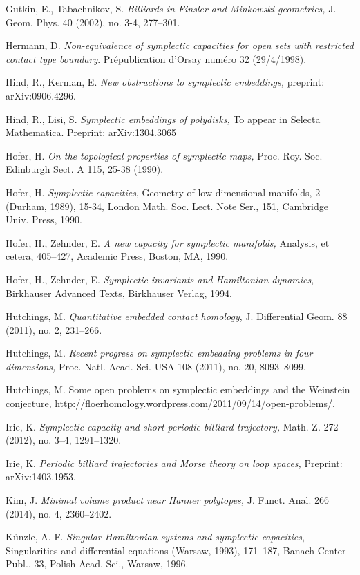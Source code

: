 \documentclass{icmart}
\theoremstyle{definition}
\begin{document}
\begin{thebibliography}{7}
 Gutkin, E., Tabachnikov, S. {\it Billiards in Finsler and Minkowski geometries,} J. Geom. Phys. 40 (2002), no. 3-4, 277--301.

 Hermann, D. {\it Non-equivalence of symplectic capacities for open
sets with restricted contact type boundary}. Pr\'epublication
d'Orsay num\'ero 32 (29/4/1998).

 Hind, R., Kerman, E. {\it New obstructions to symplectic embeddings,} preprint:  arXiv:0906.4296.

  Hind, R., Lisi, S. {\it Symplectic embeddings of polydisks,} To appear in Selecta Mathematica.  Preprint: arXiv:1304.3065

 Hofer, H. {\it On the topological properties of symplectic
maps,} Proc. Roy. Soc. Edinburgh Sect. A 115, 25-38 (1990).

 Hofer, H. {\it Symplectic capacities}, 
Geometry of low-dimensional manifolds, 2 (Durham, 1989), 15-34, 
London Math. Soc. Lect. Note Ser., 151, Cambridge Univ. Press,  1990. 

 Hofer, H., Zehnder, E. {\it A new capacity for symplectic manifolds,}  Analysis, et cetera, 405--427, Academic Press, Boston, MA, 1990. 


 Hofer, H.,  Zehnder, E. {\it Symplectic invariants
and Hamiltonian dynamics}, Birkhauser Advanced Texts, Birkhauser
Verlag, 1994.


 Hutchings, M. {\it Quantitative embedded contact homology}, J. Differential Geom. 88 (2011), no. 2, 231--266. 


 Hutchings, M. {\it Recent progress on symplectic embedding problems in four dimensions,} Proc. Natl. Acad. Sci. USA 108 (2011), no. 20, 8093--8099.

 Hutchings, M. {Some open problems on symplectic embeddings and the Weinstein conjecture}, 
http://floerhomology.wordpress.com/2011/09/14/open-problems/. 

 Irie, K. {\it Symplectic capacity and short periodic billiard trajectory,} Math. Z. 272 (2012), no. 3--4, 1291--1320.

 Irie, K. {\it Periodic billiard trajectories and Morse theory on loop spaces,}  Preprint: arXiv:1403.1953.

 Kim, J. {\it Minimal volume product near Hanner polytopes,} J. Funct. Anal. 266 (2014), no. 4, 2360--2402. 


 K\"unzle, A. F. {\it Singular Hamiltonian systems and symplectic capacities}, Singularities and differential equations (Warsaw, 1993), 171--187, 
Banach Center Publ., 33, Polish Acad. Sci., Warsaw, 1996. 


\end{thebibliography}
\end{document}
